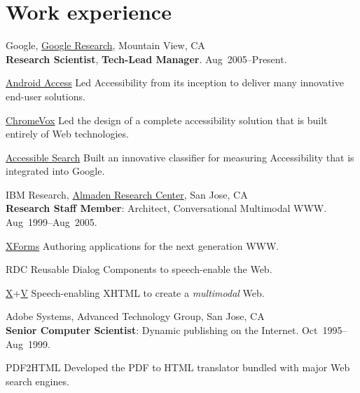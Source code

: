 \documentclass{article}
\begin{document}
\section*{Work experience}
\begin{compactitem}
  \item {Google},
  \href{http://www.google.com/search?q=\%22tv+raman\%22}{Google Research}, Mountain View, CA\\
  \textbf{Research Scientist}, \textbf{Tech-Lead Manager}.
\hfill Aug~2005--Present.
\begin{compactdesc}
\item[\href{http://eyes-free.googlecode.com}{Android Access}]  Led  Accessibility from its
inception to deliver many innovative end-user solutions.
\item[\href{http://google-axs-chrome.googlecode.com}{ChromeVox}]  Led the design of a  complete accessibility
solution that is built entirely of Web technologies.
\item[\href{http://labs.google.com/accessible}{Accessible Search}] Built an innovative classifier for
  measuring  Accessibility  that is integrated into Google.
  
\end{compactdesc}

\item {IBM Research},
\href{http://www.google.com/search?q=tv+raman+IBM+Almaden}{Almaden Research Center}, San Jose, CA\\
  \textbf{Research Staff Member}: Architect, Conversational
  Multimodal WWW\@. \hfill Aug~1999--Aug~2005.
\begin{compactdesc}
\item [\href{http://www.amazon.com/XForms-XML-Powered-Web-Forms/dp/0321154991}{XForms}] Authoring applications for the next generation
  WWW.\@
\item [RDC] Reusable Dialog Components to speech-enable the Web.

\item [\href{http://www.w3.org/tr/xml-events}{X$+$V}] Speech-enabling XHTML to create a \emph{multimodal\/}
  Web.
\end{compactdesc}
\item   {Adobe Systems},  {Advanced Technology Group}, San Jose, CA\\
  \textbf{Senior Computer Scientist}: Dynamic publishing on the
  Internet.  \hfill Oct~1995--Aug~1999.
\begin{compactdesc}
\item[PDF2HTML] Developed the PDF to HTML translator bundled with
  major Web search engines.
  

\end{compactdesc}
\end{compactitem}
\end{document}
